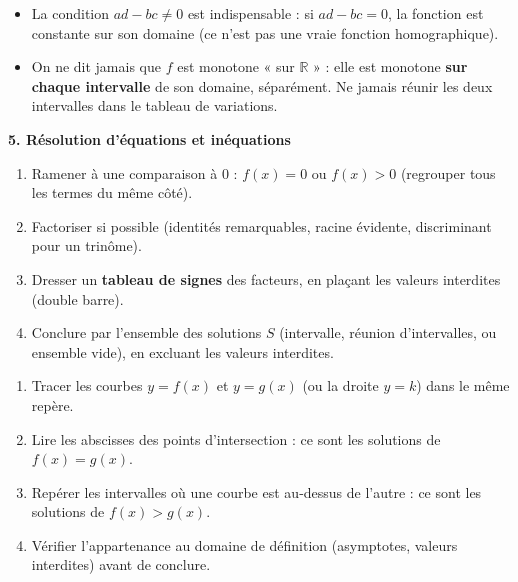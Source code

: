 \documentclass[11pt]{article}
\begin{document}
\begin{attention}
\begin{itemize}
  \item La condition $ad-bc\neq0$ est indispensable : si $ad-bc=0$, la fonction est constante sur son domaine (ce n'est pas une vraie fonction homographique).
  \item On ne dit jamais que $f$ est monotone « sur $\mathbb{R}$ » : elle est monotone \textbf{sur chaque intervalle} de son domaine, séparément. Ne jamais réunir les deux intervalles dans le tableau de variations.
\end{itemize}
\end{attention}

\textbf{5. Résolution d'équations et inéquations}\par
\begin{methode}
\begin{enumerate}
  \item Ramener à une comparaison à 0 : $f(x)=0$ ou $f(x)>0$ (regrouper tous les termes du même côté).
  \item Factoriser si possible (identités remarquables, racine évidente, discriminant pour un trinôme).
  \item Dresser un \textbf{tableau de signes} des facteurs, en plaçant les valeurs interdites (double barre).
  \item Conclure par l'ensemble des solutions $S$ (intervalle, réunion d'intervalles, ou ensemble vide), en excluant les valeurs interdites.
\end{enumerate}
\end{methode}

\begin{methode}
\begin{enumerate}
  \item Tracer les courbes $y=f(x)$ et $y=g(x)$ (ou la droite $y=k$) dans le même repère.
  \item Lire les abscisses des points d'intersection : ce sont les solutions de $f(x)=g(x)$.
  \item Repérer les intervalles où une courbe est au-dessus de l'autre : ce sont les solutions de $f(x)>g(x)$.
  \item Vérifier l'appartenance au domaine de définition (asymptotes, valeurs interdites) avant de conclure.
\end{enumerate}
\end{methode}
\end{document}
